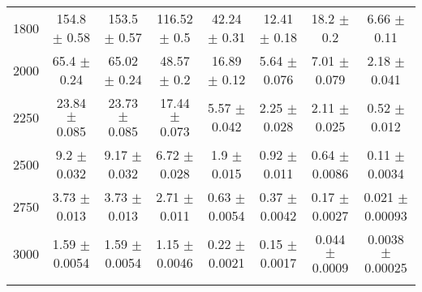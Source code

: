 \begin{footnotesize}
\begin{tabular}{c|c|c|c|c|c|c|c}
1800 & 154.8 $\pm$ 0.58 & 153.5 $\pm$ 0.57 & 116.52 $\pm$ 0.5 & 42.24 $\pm$ 0.31 & 12.41 $\pm$ 0.18 & 18.2 $\pm$ 0.2 & 6.66 $\pm$ 0.11\\ 
2000 & 65.4 $\pm$ 0.24 & 65.02 $\pm$ 0.24 & 48.57 $\pm$ 0.2 & 16.89 $\pm$ 0.12 & 5.64 $\pm$ 0.076 & 7.01 $\pm$ 0.079 & 2.18 $\pm$ 0.041\\ 
2250 & 23.84 $\pm$ 0.085 & 23.73 $\pm$ 0.085 & 17.44 $\pm$ 0.073 & 5.57 $\pm$ 0.042 & 2.25 $\pm$ 0.028 & 2.11 $\pm$ 0.025 & 0.52 $\pm$ 0.012\\ 
2500 & 9.2 $\pm$ 0.032 & 9.17 $\pm$ 0.032 & 6.72 $\pm$ 0.028 & 1.9 $\pm$ 0.015 & 0.92 $\pm$ 0.011 & 0.64 $\pm$ 0.0086 & 0.11 $\pm$ 0.0034\\ 
2750 & 3.73 $\pm$ 0.013 & 3.73 $\pm$ 0.013 & 2.71 $\pm$ 0.011 & 0.63 $\pm$ 0.0054 & 0.37 $\pm$ 0.0042 & 0.17 $\pm$ 0.0027 & 0.021 $\pm$ 0.00093\\ 
3000 & 1.59 $\pm$ 0.0054 & 1.59 $\pm$ 0.0054 & 1.15 $\pm$ 0.0046 & 0.22 $\pm$ 0.0021 & 0.15 $\pm$ 0.0017 & 0.044 $\pm$ 0.0009 & 0.0038 $\pm$ 0.00025\\ 
& & & & & & &\\ 
\hline\hline 
\end{tabular} 
\end{footnotesize} 
\newline 
